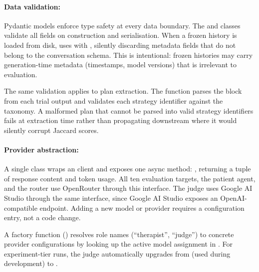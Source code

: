 \paragraph{Data validation:}
Pydantic models enforce type safety at every data boundary. The
 and  classes validate all fields on
construction and serialisation. When a frozen history is loaded from disk,
 uses  with
, silently discarding metadata fields that do not
belong to the conversation schema. This is intentional: frozen histories
may carry generation-time metadata (timestamps, model versions) that is
irrelevant to evaluation.

The same validation applies to plan extraction. The
 function parses the 
block from each trial output and validates each strategy identifier against
the taxonomy. A malformed plan that cannot be parsed into valid strategy
identifiers fails at extraction time rather than propagating downstream
where it would silently corrupt Jaccard scores.

\paragraph{Provider abstraction:}
A single  class wraps an  client
and exposes one async method: ,
returning a tuple of response content and token usage. All ten evaluation
targets, the patient agent, and the router use OpenRouter through this
interface. The  judge uses Google AI Studio through the
same interface, since Google AI Studio exposes an OpenAI-compatible
endpoint. Adding a new model or provider requires a configuration entry,
not a code change.

A factory function () resolves role names
(\eg ``therapist'', ``judge'') to concrete provider configurations by
looking up the active model assignment in . For
experiment-tier runs, the judge automatically upgrades from
 (used during development) to
.


